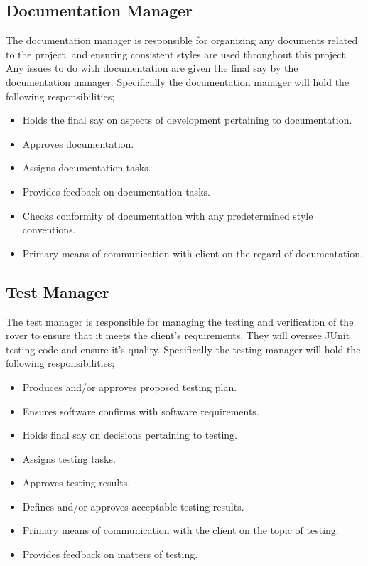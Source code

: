 \documentclass{article}
\begin{document}
\begin{adjustwidth}{0em}{0pt}
\subsection{Documentation Manager}
\begin{adjustwidth}{1em}{0pt}
The documentation manager is responsible for organizing any documents related to the project, and ensuring consistent styles are used throughout this project. Any issues to do with documentation are given the final say by the documentation manager. Specifically the documentation manager will hold the following responsibilities;
\begin{itemize}
\item Holds the final say on aspects of development pertaining to documentation.
\item Approves documentation. 
\item Assigns documentation tasks.
\item Provides feedback on documentation tasks. 
\item Checks conformity of documentation with any predetermined style conventions.
\item Primary means of communication with client on the regard of documentation.
\end{itemize}
\end{adjustwidth}

\subsection{Test Manager}
\begin{adjustwidth}{1em}{0pt}
The test manager is responsible for managing the testing and verification of the rover to ensure that it meets the client's requirements. They will oversee JUnit testing code and ensure it's quality. Specifically the testing manager will hold the following responsibilities;
\begin{itemize}
\item Produces and/or approves proposed testing plan.
\item Ensures software confirms with software requirements.
\item Holds final say on decisions pertaining to testing.
\item Assigns testing tasks. 
\item Approves testing results.
\item Defines and/or approves acceptable testing results.
\item Primary means of communication with the client on the topic of testing. 
\item Provides feedback on matters of testing. 
\end{itemize}
\end{adjustwidth}


\end{adjustwidth}
\end{document}
